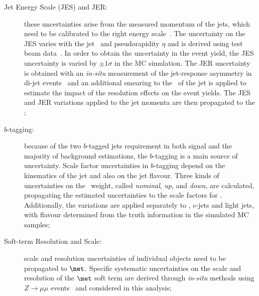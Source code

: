 			\begin{description}
				\item [Jet Energy Scale (JES) and \ac{JER}:] these uncertainties arise from the measured momentum of the jets, which need to be calibrated to the right energy scale~\cite{ATLAS13TeVJES}. The uncertainty on the \ac{JES} varies with the jet \pt\ and pseudorapidity $\eta$ and is derived using test beam data~\cite{Aad:1409965}. %
				In order to obtain the uncertainty in the event yield, the \ac{JES} uncertainty is varied by $\pm 1 \sigma$ in the MC simulation. The \ac{JER} uncertainty is obtained with an \emph{in-situ} measurement of the jet-response asymmetry in di-jet events~\cite{ATLAS2010JER} and an additional smearing to the \pt\ of the jet is applied to estimate the impact of the resolution effects on the event yields. The \ac{JES} and \ac{JER} variations applied to the jet momenta are then propagated to the \met; 



				\item [$b$-tagging:] because of the two $b$-tagged jets requirement in both signal and the majority of background estimations, the $b$-tagging is a main source of uncertainty. Scale factor uncertainties in $b$-tagging depend on the kinematics of the jet and also on the jet flavour. Three kinds of uncertainties on the \bj\ weight, called \emph{nominal}, \emph{up}, and \emph{down}, are calculated, propagating the estimated uncertainties to the scale factors for \bjs. Additionally, the variations are applied separately to \bjs, $c$-jets and light jets, with flavour determined from the truth information in the simulated \ac{MC} samples; 

				\item[\boldmath \met Soft-term Resolution and Scale:] scale and resolution uncertainties of individual objects need to be propagated to $\met$. Specific systematic uncertainties on the scale and resolution of the $\met$ soft term are derived through \emph{in-situ} methods using $Z \rightarrow \mu\mu$ events~\cite{ATLASMet2015} and considered in this analysis;


\end{description}
